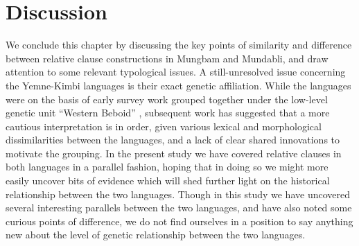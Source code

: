 \documentclass[10pt,twoside]{article}
\begin{document}
\section{Discussion}\label{secDiscussion}
We conclude this chapter by discussing the key points of similarity and difference between
relative clause constructions in Mungbam and Mundabli, and draw attention to some relevant
typological issues.
A still-unresolved issue concerning the Yemne-Kimbi languages is their
exact genetic affiliation. While the languages were on the basis of
early survey work grouped together under the low-level genetic unit ``Western Beboid''
\citep{hombert:1980}, subsequent work \citep{tervuren,good:inprep}
has suggested that a more cautious interpretation is in order, given various lexical and
morphological dissimilarities between the languages, and a lack of
clear shared innovations to motivate the grouping. In the present study
we have covered relative clauses in both languages in a parallel
fashion, hoping that in doing so we might more easily uncover bits of
evidence which will shed further light on the historical relationship between
the two languages. Though in this study we have uncovered several interesting
parallels between the two languages, and have also noted some curious
points of difference, we do not find ourselves in a position to
say anything new about the level of genetic relationship between the two languages. 
\end{document}
